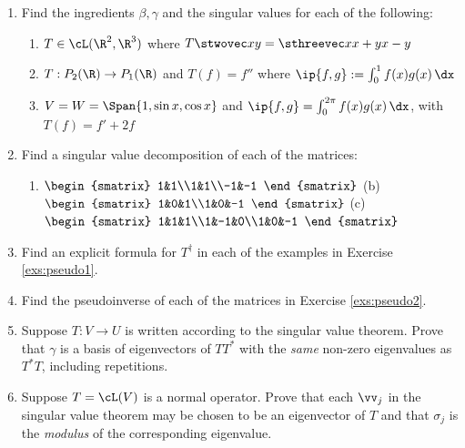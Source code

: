 \begin{exercises}[breakable]
\begin{enumerate}[label=\thesubsection.\arabic*., align=right]
  \item\label{exs:pseudo1} Find the ingredients $\beta,\gamma$ and the singular values for each of the following:
  \begin{enumerate}
    \item $T\in\cL(\R^2,\R^3)$ where $T\stwovec xy=\sthreevec x{x+y}{x-y}$
    \item $T:P_2(\R)\to P_1(\R)$ and $T(f)=f''$ where $\ip{f,g}:=\int_0^1f(x)g(x)\,\dx$
    \item $V=W=\Span\{1,\sin x,\cos x\}$ and $\ip{f,g}=\int_0^{2\pi}f(x)g(x)\,\dx$, with $T(f)=f'+2f$
  \end{enumerate}
  
  \item\label{exs:pseudo2} Find a singular value decomposition of each of the matrices:
  \begin{enumerate}
    \item $\begin{smatrix}
    1&1\\1&1\\-1&-1
    \end{smatrix}$\qquad
    (b)\ \ $\begin{smatrix}
    1&0&1\\1&0&-1
    \end{smatrix}$\qquad
    (c)\ \ $\begin{smatrix}
    1&1&1\\1&-1&0\\1&0&-1
    \end{smatrix}$
  \end{enumerate}
  
  \item Find an explicit formula for $T^\dag$ in each of the examples in Exercise \ref{exs:pseudo1}.
  
  \item Find the pseudoinverse of each of the matrices in Exercise \ref{exs:pseudo2}.
  
  \item Suppose $T:V\to U$ is written according to the singular value theorem. Prove that $\gamma$ is a basis of eigenvectors of $TT^*$ with the \emph{same} non-zero eigenvalues as $T^*T$, including repetitions.
  
  \item Suppose $T=\cL(V)$ is a normal operator. Prove that each $\vv_j$ in the singular value theorem may be chosen to be an eigenvector of $T$ and that $\sigma_j$ is the \emph{modulus} of the corresponding eigenvalue.
  

\end{enumerate}
\end{exercises}
